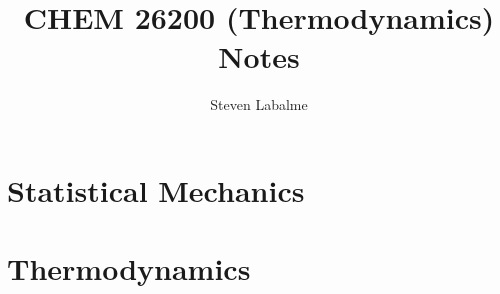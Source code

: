 \documentclass{report}
\title{CHEM 26200 (Thermodynamics) Notes}
\author{Steven Labalme}
\renewcommand{\chaptername}{Week}
\begin{document}
\maketitle



\tableofcontents
\listoffigures
\listoftables
\newpage



\pagestyle{main}
\renewcommand{\chaptermark}[1]{\markboth{\chaptername\ \thechapter\ (#1)}{}}
\part{Statistical Mechanics}




\part{Thermodynamics}








\printbibliography[heading=bibintoc]
\end{document}
